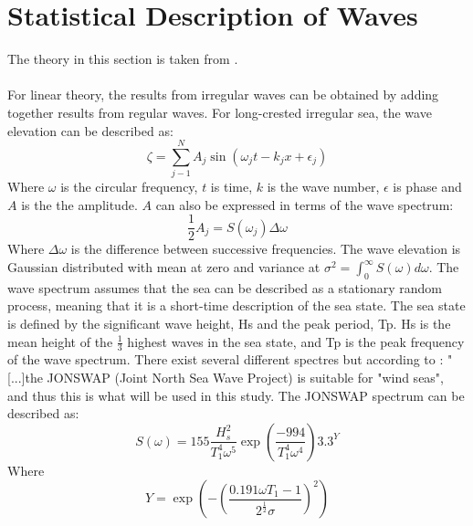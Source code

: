 \section{Statistical Description of Waves} 
 The theory in this section is taken from \cite{Faltinsen1990}.\\\\ For linear theory, the results from irregular waves can be obtained by adding together results from regular waves. For long-crested irregular sea, the wave elevation can be described as:
\begin{equation}
    \zeta = \sum_{j-1}^N A_j \sin(\omega_jt-k_jx+\epsilon_j)
    \label{eq:elevation}
\end{equation}
Where $\omega$ is the circular frequency, $t$ is time, $k$ is the wave number, $\epsilon$ is phase and $A$ is the the amplitude. $A$ can also be expressed in terms of the wave spectrum:
\begin{equation}
    \frac{1}{2}A_j=S(\omega_j) \Delta \omega
\end{equation}
Where $\Delta \omega$ is the difference between successive frequencies. The wave elevation is Gaussian distributed with mean at zero and variance at $\sigma^2= \int_0 ^ \infty S(\omega) d\omega $. The wave spectrum assumes that the sea can be described as a stationary random process, meaning that it is a short-time description of the sea state. The sea state is defined by the significant wave height, Hs and the peak period, Tp. Hs is the mean height of the $\frac{1}{3}$ highest waves in the sea state, and Tp is the peak frequency of the wave spectrum. There exist several different spectres but according to \cite{Lifes50+D1.1}: "[...]the JONSWAP (Joint North Sea Wave Project) is suitable for "wind seas", and thus this is what will be used in this study. The JONSWAP spectrum can be described as:
\begin{equation}
    S(\omega)=155 \frac{H_s^2}{T_1^4 \omega ^5} \exp{(\frac{-994}{T_1^4 \omega ^4})} 3.3^Y
\end{equation}
Where
\begin{equation}
    Y= \exp \left(-\left( \frac{0.191 \omega T_1 -1}{2^\frac{1}{2} \sigma} \right)^2\right)
\end{equation}

